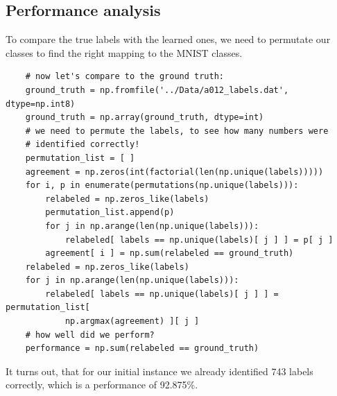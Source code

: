 \subsection{Performance analysis}\label{sec:4.4}
To compare the true labels with the learned ones, we need to permutate our classes to find the right mapping to the MNIST classes.
\begin{verbatim}
    # now let's compare to the ground truth:
    ground_truth = np.fromfile('../Data/a012_labels.dat', dtype=np.int8)
    ground_truth = np.array(ground_truth, dtype=int)
    # we need to permute the labels, to see how many numbers were
    # identified correctly!
    permutation_list = [ ]
    agreement = np.zeros(int(factorial(len(np.unique(labels)))))
    for i, p in enumerate(permutations(np.unique(labels))):
        relabeled = np.zeros_like(labels)
        permutation_list.append(p)
        for j in np.arange(len(np.unique(labels))):
            relabeled[ labels == np.unique(labels)[ j ] ] = p[ j ]
        agreement[ i ] = np.sum(relabeled == ground_truth)
    relabeled = np.zeros_like(labels)
    for j in np.arange(len(np.unique(labels))):
        relabeled[ labels == np.unique(labels)[ j ] ] = permutation_list[
            np.argmax(agreement) ][ j ]
    # how well did we perform?
    performance = np.sum(relabeled == ground_truth)
\end{verbatim}
It turns out, that for our initial instance we already identified 743 labels correctly, which is a performance of 92.875\%.

